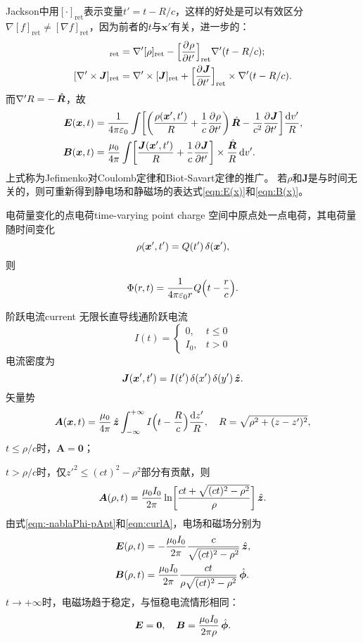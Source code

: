 Jackson中用$[\cdot]_\text{ret}$表示变量$t'=t-R/c$，这样的好处是可以有效区分$\nabla[f]_\text{ret}\neq[\nabla f]_\text{ret}$，因为前者的$t$与$\bm x'$有关，进一步的：
\begin{align*}
    [\nabla'\rho]_\text{ret}&=\nabla'[\rho]_\text{ret}-\Bigfkh{\pv\rho{t'}}_\text{ret}\nabla'(t-R/c);\\
    [\nabla'\times\bm J]_\text{ret}&=\nabla'\times[\bm J]_\text{ret}+\Bigfkh{\pv{\bm J}{t'}}_\text{ret}\times\nabla'(t-R/c).
\end{align*}
而$\nabla'R=-\mathop{}\!\hat{\bm{R}}$，故
\begin{align}
    \bm E(\bm x,t)&=\frac1{4\pi\varepsilon_0}\int\biggl[\biggl(\frac{\rho(\bm x',t')}R+\frac1c\frac{\partial^{{}}\rho}{\partial{t'}^{{}}}\biggr)\mathop{}\!\hat{\bm{R}}-\frac1{c^2}\frac{\partial^{{}}\bm J}{\partial{t'}^{{}}}\biggr]\frac{\mathop{}\!\mathrm{d} v'}R,\\
    \bm B(\bm x,t)&=\frac{\mu_0}{4\pi}\int\biggl[\frac{\bm J(\bm x',t')}R+\frac1c\frac{\partial^{{}}\bm J}{\partial{t'}^{{}}}\biggr]\times\frac{\hat{\bm{R}}}R\mathop{}\!\mathrm{d} v'.
\end{align}
上式称为Jefimenko对Coulomb定律和Biot-Savart定律的推广。
若$\rho$和$\bm J$是与时间无关的，则可重新得到静电场和静磁场的表达式\eqref{eqn:E(x)}和\eqref{eqn:B(x)}。
\begin{example}{电荷量变化的点电荷}{time-varying point charge}
    空间中原点处一点电荷，其电荷量随时间变化
    \[
        \rho(\bm x',t')=Q(t')\mathop{}\!\delta(\bm x'),
    \]
    则
    \[
        \Phi(r,t)=\frac1{4\pi\varepsilon_0r}Q\Bigl(t-\frac rc\Bigr).
    \]
\end{example}
\begin{example}{阶跃电流}{current}
    无限长直导线通阶跃电流
    \[
        I(t)=\begin{cases}
            0,&t\leqslant 0\\
            I_0,&t>0
        \end{cases}
    \]
    电流密度为
    \[
        \bm J(\bm x',t')=I(t')\mathop{}\!\delta(x')\mathop{}\!\delta(y')\mathop{}\!\hat{\bm{z}}.
    \]
    矢量势
    \[
        \bm A(\bm x,t)=\frac{\mu_0}{4\pi}\mathop{}\!\hat{\bm{z}}\int_{-\infty}^{+\infty} I\Bigl(t-\frac Rc\Bigr)\frac{\mathop{}\!\mathrm{d} z'}R,\quad R=\sqrt{\rho^2+(z-z')^2},
    \]
    $t\leqslant\rho/c$时，$\bm A=\bm 0$；
    
    $t>\rho/c$时，仅$z'^2\leqslant(ct)^2-\rho^2$部分有贡献，则
    \[
        \bm A(\rho,t)=\frac{\mu_0I_0}{2\pi}\ln\biggl[\frac{ct+\sqrt{(ct)^2-\rho^2}}{\rho}\biggr]\mathop{}\!\hat{\bm{z}}.
    \]
    由式\eqref{eqn:-nablaPhi-pApt}和\eqref{eqn:curlA}，电场和磁场分别为
    \begin{align*}
        \bm E(\rho,t)&=-\frac{\mu_0I_0}{2\pi}\frac c{\sqrt{(ct)^2-\rho^2}}\mathop{}\!\hat{\bm{z}},\\
        \bm B(\rho,t)&=\frac{\mu_0I_0}{2\pi}\frac{ct}{\rho\sqrt{(ct)^2-\rho^2}}\mathop{}\!\hat{\bm{\phi}}.
    \end{align*}
    $t\to+\infty$时，电磁场趋于稳定，与恒稳电流情形相同：
    \[
        \bm E=\bm 0,\quad\bm B=\frac{\mu_0I_0}{2\pi\rho}\mathop{}\!\hat{\bm{\phi}}.
    \]
\end{example}
